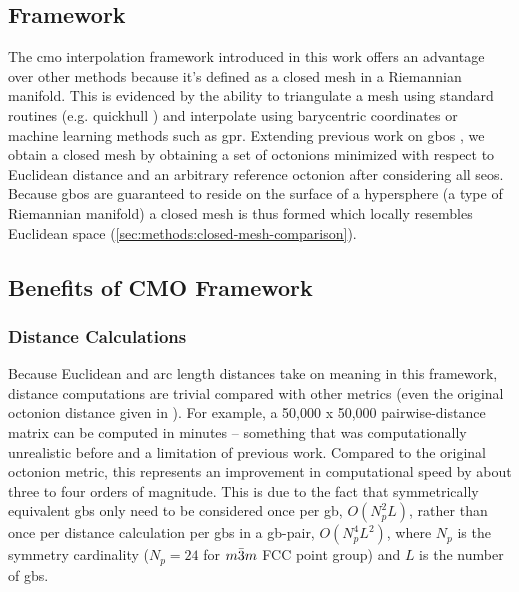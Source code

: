 \documentclass[preprint,12pt]{elsarticle}
\begin{document}
\subsection{ Framework}
The \gls{cmo} interpolation framework introduced in this work offers an advantage over other methods because it's defined as a closed mesh in a Riemannian manifold. This is evidenced by the ability to triangulate a mesh using standard routines (e.g. quickhull \cite{barberQuickhullAlgorithmConvex1996}) and interpolate using barycentric coordinates or machine learning methods such as \gls{gpr}. Extending previous work on \glspl{gbo} \cite{francisGeodesicOctonionMetric2019,chesserLearningGrainBoundary2020}, we obtain a closed mesh by obtaining a set of octonions minimized with respect to Euclidean distance and an arbitrary reference octonion after considering all \glspl{seo}. Because \glspl{gbo} are guaranteed to reside on the surface of a hypersphere \cite{francisGeodesicOctonionMetric2019} (a type of Riemannian manifold) a closed mesh is thus formed which locally resembles Euclidean space (\ref{sec:methods:closed-mesh-comparison}).

\subsection{Benefits of CMO Framework}
\subsubsection{Distance Calculations}
Because Euclidean and arc length distances take on meaning in this framework, distance computations are trivial compared with other metrics (even the original octonion distance given in \cite{francisGeodesicOctonionMetric2019}). For example, a 50,000 x 50,000 pairwise-distance matrix can be computed in minutes -- something that was computationally unrealistic before and a limitation of previous work. Compared to the original octonion metric, this represents an improvement in computational speed by about three to four orders of magnitude. This is due to the fact that symmetrically equivalent \glspl{gb} only need to be considered once per \gls{gb}, $O(N_p^2L)$, rather than once per distance calculation per \glspl{gb} in a \gls{gb}-pair, $O(N_p^4L^2)$, where $N_p$ is the symmetry cardinality ($N_p=24$ for $m\Bar{3}m$ FCC point group) and $L$ is the number of \glspl{gb}. %
\end{document}
